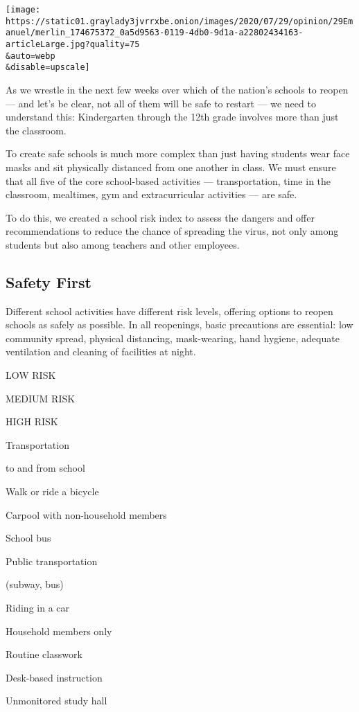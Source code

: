 \texttt{[image: https://static01.graylady3jvrrxbe.onion/images/2020/07/29/opinion/29Emanuel/merlin\_174675372\_0a5d9563-0119-4db0-9d1a-a22802434163-articleLarge.jpg?quality=75\\\&auto=webp\\\&disable=upscale]}

As we wrestle in the next few weeks over which of the nation's schools
to reopen --- and let's be clear, not all of them will be safe to
restart --- we need to understand this: Kindergarten through the 12th
grade involves more than just the classroom.

To create safe schools is much more complex than just having students
wear face masks and sit physically distanced from one another in class.
We must ensure that all five of the core school-based activities ---
transportation, time in the classroom, mealtimes, gym and
extracurricular activities --- are safe.

To do this, we created a school risk index to assess the dangers and
offer recommendations to reduce the chance of spreading the virus, not
only among students but also among teachers and other employees.

\hypertarget{safety-first}{%
\subsection{Safety First}\label{safety-first}}

Different school activities have different risk levels, offering options
to reopen schools as safely as possible. In all reopenings, basic
precautions are essential: low community spread, physical distancing,
mask-wearing, hand hygiene, adequate ventilation and cleaning of
facilities at night.

LOW RISK

MEDIUM RISK

HIGH RISK

Transportation

to and from school

Walk or ride a bicycle

Carpool with non-household members

School bus

Public transportation

(subway, bus)

Riding in a car

Household members only

Routine classwork

Desk-based instruction

Unmonitored study hall

